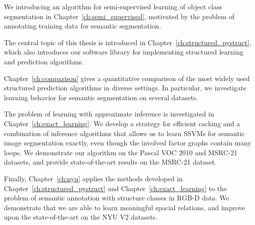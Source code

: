 We introducing an algorithm for  semi-supervised learning of object class
segmentation in Chapter~\ref{ch:semi_supervised}, motivated by the problem of
annotating training data for semantic segmentation.

The central topic of this thesis is introduced in
Chapter~\ref{ch:structured_pystruct}, which also introduces our software
library for implementing structured learning and prediction algorithms.

Chapter~\ref{ch:comparison} gives a quantitative comparison of the most widely
used structured prediction algorithms in diverse settings.
In particular, we investigate learning behavior for
semantic segmentation on several datasets.

The problem of learning with approximate inference is investigated in
Chapter~\ref{ch:exact_learning}.  We develop a strategy for efficient caching
and a combination of inference algorithms that allows us to learn SSVMs for
semantic image segmentation exactly, even though the involved factor graphs
contain many loops. We demonstrate our algorithm on the Pascal VOC 2010 and MSRC-21 datasets,
and provide state-of-the-art results on the MSRC-21 dataset.

Finally, Chapter~\ref{ch:nyu} applies the methods developed in
Chapter~\ref{ch:structured_pystruct} and Chapter~\ref{ch:exact_learning} to the
problem of semantic annotation with structure classes in RGB-D data. We
demonstrate that we are able to learn meaningful spacial relations, and improve
upon the state-of-the-art on the NYU V2 datasets.

